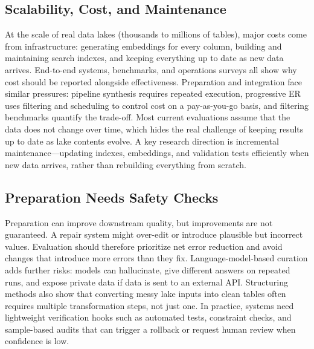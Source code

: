 \documentclass[sigconf]{acmart}
\begin{document}
\subsection{Scalability, Cost, and Maintenance}
At the scale of real data lakes (thousands to millions of tables), major costs come from infrastructure: generating embeddings for every column, building and maintaining search indexes, and keeping everything up to date as new data arrives. End-to-end systems, benchmarks, and operations surveys all show why cost should be reported alongside effectiveness. Preparation and integration face similar pressures: pipeline synthesis requires repeated execution, progressive ER uses filtering and scheduling to control cost on a pay-as-you-go basis, and filtering benchmarks quantify the trade-off. Most current evaluations assume that the data does not change over time, which hides the real challenge of keeping results up to date as lake contents evolve. A key research direction is incremental maintenance---updating indexes, embeddings, and validation tests efficiently when new data arrives, rather than rebuilding everything from scratch.

\subsection{Preparation Needs Safety Checks}
Preparation can improve downstream quality, but improvements are not guaranteed. A repair system might over-edit or introduce plausible but incorrect values. Evaluation should therefore prioritize net error reduction and avoid changes that introduce more errors than they fix. Language-model-based curation adds further risks: models can hallucinate, give different answers on repeated runs, and expose private data if data is sent to an external API. Structuring methods also show that converting messy lake inputs into clean tables often requires multiple transformation steps, not just one. In practice, systems need lightweight verification hooks such as automated tests, constraint checks, and sample-based audits that can trigger a rollback or request human review when confidence is low.
\end{document}
